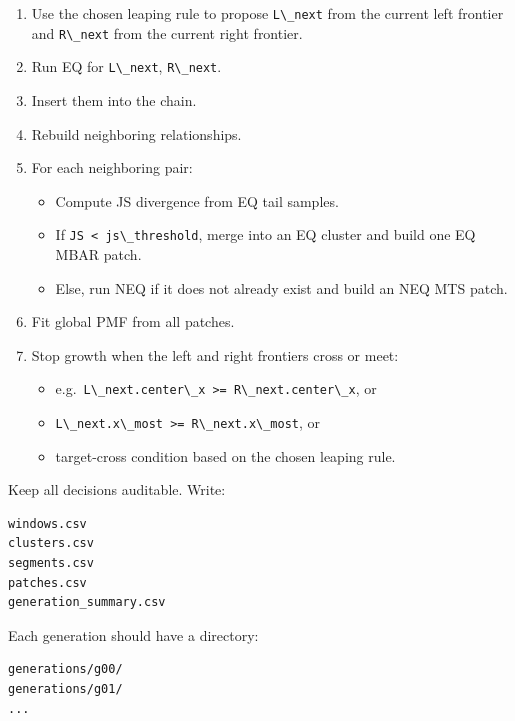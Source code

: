 \documentclass[
  10.5pt,
]{article}
\newcommand{\passthrough}[1]{#1}
\providecommand{\tightlist}{%
  \setlength{\itemsep}{0pt}\setlength{\parskip}{0pt}}
\begin{document}
\begin{enumerate}
\def\labelenumi{\arabic{enumi}.}
\tightlist
\item
  Use the chosen leaping rule to propose
  \passthrough{\lstinline!L\_next!} from the current left frontier and
  \passthrough{\lstinline!R\_next!} from the current right frontier.
\item
  Run EQ for \passthrough{\lstinline!L\_next!},
  \passthrough{\lstinline!R\_next!}.
\item
  Insert them into the chain.
\item
  Rebuild neighboring relationships.
\item
  For each neighboring pair:

  \begin{itemize}
  \tightlist
  \item
    Compute JS divergence from EQ tail samples.
  \item
    If \passthrough{\lstinline!JS < js\_threshold!}, merge into an EQ
    cluster and build one EQ MBAR patch.
  \item
    Else, run NEQ if it does not already exist and build an NEQ MTS
    patch.
  \end{itemize}
\item
  Fit global PMF from all patches.
\item
  Stop growth when the left and right frontiers cross or meet:

  \begin{itemize}
  \tightlist
  \item
    e.g.~\passthrough{\lstinline!L\_next.center\_x >= R\_next.center\_x!},
    or
  \item
    \passthrough{\lstinline!L\_next.x\_most >= R\_next.x\_most!}, or
  \item
    target-cross condition based on the chosen leaping rule.
  \end{itemize}
\end{enumerate}

Keep all decisions auditable. Write:

\begin{lstlisting}
windows.csv
clusters.csv
segments.csv
patches.csv
generation_summary.csv
\end{lstlisting}

Each generation should have a directory:

\begin{lstlisting}
generations/g00/
generations/g01/
...
\end{lstlisting}
\end{document}
